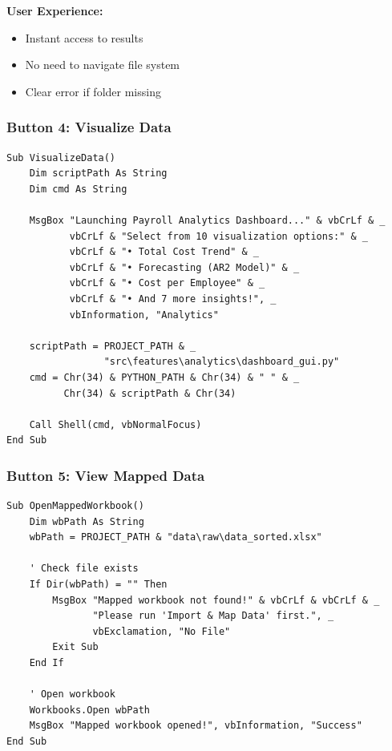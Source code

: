 \textbf{User Experience:}
\begin{itemize}
    \item Instant access to results
    \item No need to navigate file system
    \item Clear error if folder missing
\end{itemize}

\subsubsection{Button 4: Visualize Data}

\begin{lstlisting}[style=vbastyle]
Sub VisualizeData()
    Dim scriptPath As String
    Dim cmd As String
    
    MsgBox "Launching Payroll Analytics Dashboard..." & vbCrLf & _
           vbCrLf & "Select from 10 visualization options:" & _
           vbCrLf & "• Total Cost Trend" & _
           vbCrLf & "• Forecasting (AR2 Model)" & _
           vbCrLf & "• Cost per Employee" & _
           vbCrLf & "• And 7 more insights!", _
           vbInformation, "Analytics"
    
    scriptPath = PROJECT_PATH & _
                 "src\features\analytics\dashboard_gui.py"
    cmd = Chr(34) & PYTHON_PATH & Chr(34) & " " & _
          Chr(34) & scriptPath & Chr(34)
    
    Call Shell(cmd, vbNormalFocus)
End Sub
\end{lstlisting}

\subsubsection{Button 5: View Mapped Data}

\begin{lstlisting}[style=vbastyle]
Sub OpenMappedWorkbook()
    Dim wbPath As String
    wbPath = PROJECT_PATH & "data\raw\data_sorted.xlsx"
    
    ' Check file exists
    If Dir(wbPath) = "" Then
        MsgBox "Mapped workbook not found!" & vbCrLf & vbCrLf & _
               "Please run 'Import & Map Data' first.", _
               vbExclamation, "No File"
        Exit Sub
    End If
    
    ' Open workbook
    Workbooks.Open wbPath
    MsgBox "Mapped workbook opened!", vbInformation, "Success"
End Sub
\end{lstlisting}

